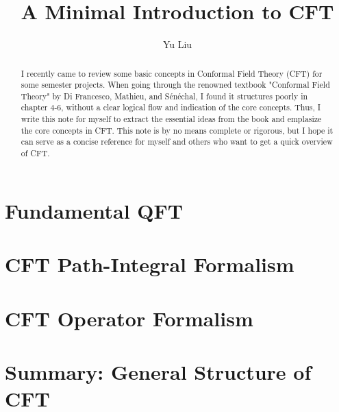\documentclass[11pt]{article}
\begin{document}
\title{\boldmath A Minimal Introduction to CFT}
\author{Yu Liu}

\maketitle

\begin{abstract}
  I recently came to review some basic concepts in Conformal Field
  Theory (CFT) for some semester projects. When going through the
  renowned textbook "Conformal Field Theory" by Di Francesco,
  Mathieu, and Sénéchal, I found it structures poorly in chapter 4-6,
  without a clear logical flow and indication of the core concepts.
  Thus, I write this note for myself to extract the essential ideas
  from the book and emplasize the core concepts in CFT. This note is
  by no means complete or rigorous, but I hope it can serve as a
  concise reference for myself and others who want to get a quick
  overview of CFT.
\end{abstract}

\tableofcontents

\newpage
\section{Fundamental QFT}\label{sec:Fundamental QFT} %


\newpage
\section{CFT Path-Integral Formalism}\label{sec:Fundamental CFT with
Path Integral Approach} %


\newpage
\section{CFT Operator Formalism}\label{sec:CFT Operator Formalism} %


\newpage
\section{Summary: General Structure of CFT}\label{sec:Summery:
General Structure of CFT} %


% 
\end{document}

